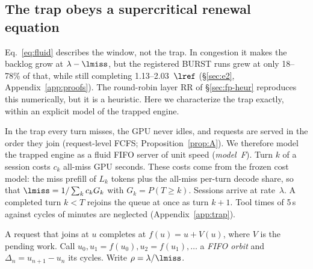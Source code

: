 \subsection{The trap obeys a supercritical renewal equation}\label{sec:trap}

Eq.~\eqref{eq:fluid} describes the window, not the trap. In congestion it makes the backlog grow at $\lambda-\lmiss$, but the
registered BURST runs grew at only 18--78\% of that, while still completing 1.13--2.03~$\lref$ (\S\ref{sec:e2},
Appendix~\ref{app:proofs}). The round-robin layer RR of \S\ref{sec:fp-heur} reproduces this numerically, but it is a
heuristic. Here we characterize the trap exactly, within an explicit model of the trapped engine.

In the trap every turn misses, the GPU never idles, and requests are served in the order they join (request-level FCFS;
Proposition~\ref{prop:A}). We therefore model the trapped engine as a fluid FIFO server of unit speed (\emph{model~F}). Turn
$k$ of a session costs $c_k$ all-miss GPU seconds. These costs come from the frozen cost model: the miss prefill of $L_k$
tokens plus the all-miss per-turn decode share, so that $\lmiss=1/\sum_kc_kG_k$ with $G_k=P(T\ge k)$. Sessions arrive at
rate~$\lambda$. A completed turn $k<T$ rejoins the queue at once as turn $k+1$. Tool times of 5\,s against cycles of
minutes are neglected (Appendix~\ref{app:trap}).

A request that joins at $u$ completes at $f(u)=u+V(u)$, where $V$ is the pending work. Call
$u_0, u_1=f(u_0), u_2=f(u_1),\dots$ a \emph{FIFO orbit} and $\Delta_n=u_{n+1}-u_n$ its cycles. Write $\rho=\lambda/\lmiss$.


